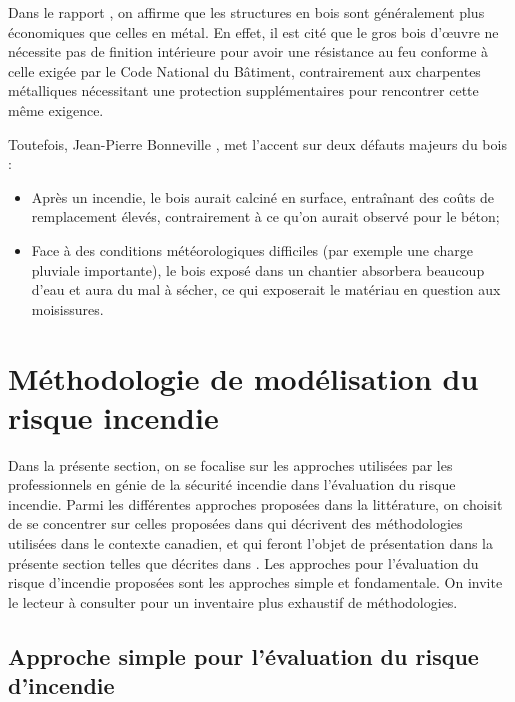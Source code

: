 \documentclass[11pt]{article}
\begin{document}
Dans le rapport \cite{cecobois}, on affirme que les structures en bois sont généralement plus économiques que celles en métal. En effet, il est cité que le gros bois d'œuvre ne nécessite pas de finition intérieure pour avoir une résistance au feu conforme à celle exigée par le Code National du Bâtiment, contrairement aux charpentes métalliques nécessitant une protection supplémentaires pour rencontrer cette même exigence. 

Toutefois, Jean-Pierre Bonneville \cite{entrevue_intact}, met l'accent sur deux défauts majeurs du bois : 
\begin{itemize}
\item Après un incendie, le bois aurait calciné en surface, entraînant des coûts de remplacement élevés, contrairement à ce qu'on aurait  observé pour le béton;
\item Face à des conditions météorologiques difficiles (par exemple une charge pluviale importante), le bois exposé dans un chantier absorbera beaucoup d'eau et aura du mal à sécher, ce qui exposerait le matériau en question aux moisissures.   
\end{itemize}

\section{Méthodologie de modélisation du risque incendie}

Dans la présente section, on se focalise sur les approches utilisées par les professionnels en génie de la sécurité incendie dans l'évaluation du risque incendie.
Parmi les différentes approches proposées dans la littérature, on choisit de se concentrer sur celles proposées dans \cite{yung2008principles} qui décrivent des méthodologies utilisées dans le contexte canadien, et qui feront l'objet de présentation dans la présente section telles que décrites dans \cite{yung2008principles}. Les approches pour l'évaluation du risque d'incendie proposées sont les approches simple et fondamentale. On invite le lecteur à consulter \cite{hadjisophocleous2004literature} pour un inventaire plus exhaustif de méthodologies.

\subsection{Approche simple pour l'évaluation du risque d'incendie}
\end{document}
